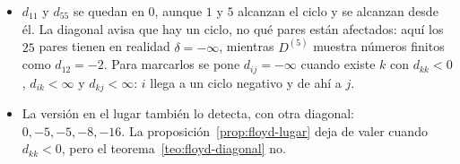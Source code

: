 \documentclass[11pt,letterpaper]{article}
\begin{document}
\begin{ejemplo}
\begin{itemize}[itemsep=0.1em]
          $d_{44}$ baja a $-6 = d_{44} + d_{44}$: la caminata da dos
          vueltas al ciclo. Con ciclos negativos los números ya no son
          pesos de caminos más cortos.
    \item $d_{11}$ y $d_{55}$ se quedan en $0$, aunque $1$ y $5$
          alcanzan el ciclo y se alcanzan desde él. La diagonal avisa
          que hay un ciclo, no qué pares están afectados: aquí los $25$
          pares tienen en realidad $\delta = -\infty$, mientras
          $D^{(5)}$ muestra números finitos como $d_{12} = -2$. Para
          marcarlos se pone $d_{ij} = -\infty$ cuando existe $k$ con
          $d_{kk} < 0$, $d_{ik} < \infty$ y $d_{kj} < \infty$: $i$
          llega a un ciclo negativo y de ahí a $j$.
    \item La versión en el lugar también lo detecta, con otra diagonal:
          $0, -5, -5, -8, -16$. La proposición~\ref{prop:floyd-lugar}
          deja de valer cuando $d_{kk} < 0$, pero el
          teorema~\ref{teo:floyd-diagonal} no.
  \end{itemize}
\end{ejemplo}
\end{document}
